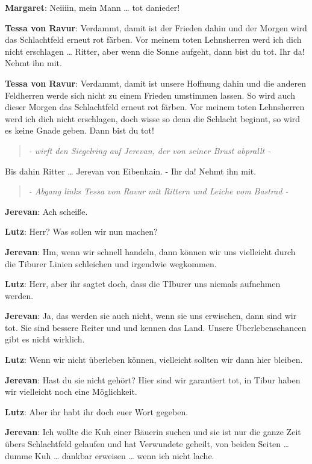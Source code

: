 \documentclass[a5paper,7pt, twocolumn]{book}
\begin{document}
\textbf{Margaret}: Neiiiin, mein Mann … tot danieder!

\textbf{Tessa von Ravur}: Verdammt, damit ist der Frieden dahin und der Morgen wird das Schlachtfeld erneut rot färben.
Vor meinem toten Lehnsherren werd ich dich nicht erschlagen … Ritter, aber wenn die Sonne aufgeht, dann bist du tot. Ihr da! Nehmt ihn mit.

\textbf{Tessa von Ravur}: Verdammt, damit ist unsere Hoffnung dahin und die anderen Feldherren werde sich nicht zu einem Frieden umstimmen lassen. So wird auch dieser Morgen das Schlachtfeld erneut rot färben. Vor meinem toten Lehnsherren werd ich dich nicht erschlagen, doch wisse so denn die Schlacht beginnt, so wird es keine Gnade geben. Dann bist du tot!

\begin{quote}
  \textit{- wirft den Siegelring auf Jerevan, der von seiner Brust abprallt -
}
 \end{quote}

Bis dahin Ritter … Jerevan von Eibenhain. - Ihr da! Nehmt ihn mit.

\begin{quote}
  \textit{- Abgang links Tessa von Ravur mit Rittern und Leiche vom Bastrad -
}
 \end{quote}


\textbf{Jerevan}: Ach scheiße.

\textbf{Lutz}: Herr? Was sollen wir nun machen?

\textbf{Jerevan}: Hm, wenn wir schnell handeln, dann können wir uns vielleicht durch die Tiburer Linien schleichen und irgendwie wegkommen.

\textbf{Lutz}: Herr, aber ihr sagtet doch, dass die TIburer uns niemals aufnehmen werden.

\textbf{Jerevan}: Ja, das werden sie auch nicht, wenn sie uns erwischen, dann sind wir tot. Sie sind bessere Reiter und und kennen das Land. Unsere Überlebenschancen gibt es nicht wirklich.

\textbf{Lutz}: Wenn wir nicht überleben können, vielleicht sollten wir dann hier bleiben.

\textbf{Jerevan}: Hast du sie nicht gehört? Hier sind wir garantiert tot, in Tibur haben wir vielleicht noch eine Möglichkeit.

\textbf{Lutz}: Aber ihr habt ihr doch euer Wort gegeben.

\textbf{Jerevan}: Ich wollte die Kuh einer Bäuerin suchen und sie ist nur die ganze Zeit übers Schlachtfeld gelaufen und hat Verwundete geheilt, von beiden Seiten … dumme Kuh … dankbar erweisen … wenn ich nicht lache.
\end{document}
